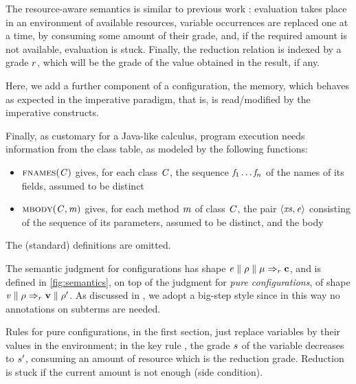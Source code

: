 The resource-aware semantics is similar to  previous work \cite{ChoudhuryEEW21,BianchiniDGZ23ecoop,BianchiniDGZ23oopsla}: evaluation takes place in an environment of available resources, variable occurrences are replaced one at a time, by consuming some amount of their grade, and, if the required amount is not available, evaluation is stuck. Finally, the reduction relation is indexed by a grade $r$, which will be the grade of the value obtained in the result, if any. 

Here, we add a further component of a configuration, the memory, which behaves as expected in the imperative paradigm, that is, is read/modified by the imperative constructs. 

Finally, as customary for a Java-like calculus, program execution needs information from the class table, as modeled by the following functions:
\begin{itemize}
\item $\textsc{fnames}(\mathit{C})$ gives, for each class $\mathit{C}$, the sequence $\mathit{f}_1\ldots\mathit{f}_n$ of the names of its fields,  assumed to be distinct
\item $\textsc{mbody}(\mathit{C},\mathit{m})$ gives, for each method $\mathit{m}$ of class $\mathit{C}$, the pair $\langle {\mathit{xs}},{\mathit{e}} \rangle$ consisting of the sequence of its parameters, assumed to be distinct, and the body
\end{itemize}
The (standard) definitions are omitted.

The
semantic judgment for configurations has shape $\mathit{e}\parallel\rho\parallel\mu\Rightarrow_{r}\mathbf{c}$, and is defined in \cref{fig:semantics}, on top of the judgment  for \emph{pure configurations}, of shape $\mathit{v}\parallel\rho\Rightarrow_{r}\mathbf{v}\parallel\rho'$. As discussed in \cite{BianchiniDGZ23oopsla}, we adopt a big-step style since in this way no annotations on subterms are needed. 

Rules for  pure configurations, in the first section, just replace variables by their values in the environment; in the key rule , the grade $s$ of the variable decreases to $s'$, consuming an amount of resource which is the reduction grade. Reduction is stuck if the current amount is not enough (side condition). 

